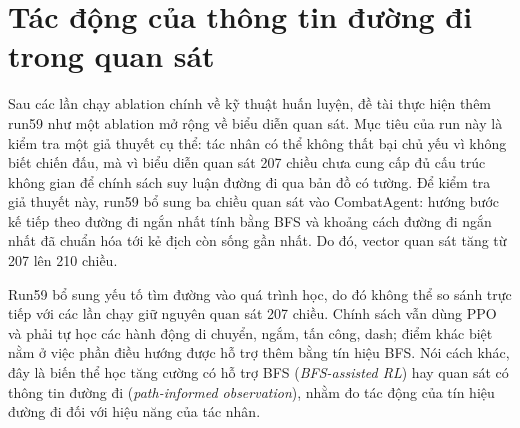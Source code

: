 \section{Tác động của thông tin đường đi trong quan sát}
\label{sec:run59_path_informed}

Sau các lần chạy ablation chính về kỹ thuật huấn luyện, đề tài thực hiện thêm run59 như một ablation mở rộng về biểu diễn quan sát. Mục tiêu của run này là kiểm tra một giả thuyết cụ thể: tác nhân có thể không thất bại chủ yếu vì không biết chiến đấu, mà vì biểu diễn quan sát 207 chiều chưa cung cấp đủ cấu trúc không gian để chính sách suy luận đường đi qua bản đồ có tường. Để kiểm tra giả thuyết này, run59 bổ sung ba chiều quan sát vào CombatAgent: hướng bước kế tiếp theo đường đi ngắn nhất tính bằng BFS và khoảng cách đường đi ngắn nhất đã chuẩn hóa tới kẻ địch còn sống gần nhất. Do đó, vector quan sát tăng từ 207 lên 210 chiều.

Run59 bổ sung yếu tố tìm đường vào quá trình học, do đó không thể so sánh trực tiếp với các lần chạy giữ nguyên quan sát 207 chiều. Chính sách vẫn dùng PPO và phải tự học các hành động di chuyển, ngắm, tấn công, dash; điểm khác biệt nằm ở việc phần điều hướng được hỗ trợ thêm bằng tín hiệu BFS. Nói cách khác, đây là biến thể học tăng cường có hỗ trợ BFS (\emph{BFS-assisted RL}) hay quan sát có thông tin đường đi (\emph{path-informed observation}), nhằm đo tác động của tín hiệu đường đi đối với hiệu năng của tác nhân.

